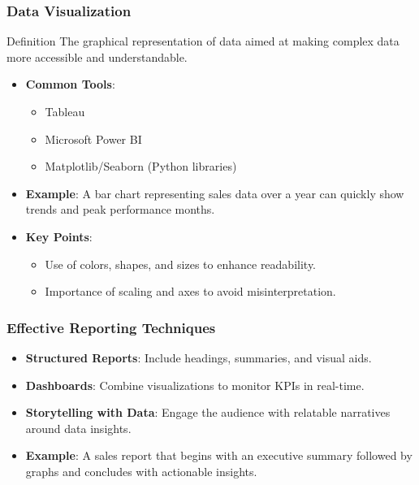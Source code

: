 \documentclass[aspectratio=169]{beamer}
\begin{document}
\begin{frame}[fragile]
    \frametitle{Data Visualization}
    \begin{block}{Definition}
        The graphical representation of data aimed at making complex data more accessible and understandable.
    \end{block}
    \begin{itemize}
        \item \textbf{Common Tools}:
        \begin{itemize}
            \item Tableau
            \item Microsoft Power BI
            \item Matplotlib/Seaborn (Python libraries)
        \end{itemize}
        \item \textbf{Example}: A bar chart representing sales data over a year can quickly show trends and peak performance months.
        \item \textbf{Key Points}:
        \begin{itemize}
            \item Use of colors, shapes, and sizes to enhance readability.
            \item Importance of scaling and axes to avoid misinterpretation.
        \end{itemize}
    \end{itemize}
\end{frame}

\begin{frame}[fragile]
    \frametitle{Effective Reporting Techniques}
    \begin{itemize}
        \item \textbf{Structured Reports}: Include headings, summaries, and visual aids.
        \item \textbf{Dashboards}: Combine visualizations to monitor KPIs in real-time.
        \item \textbf{Storytelling with Data}: Engage the audience with relatable narratives around data insights.
        \item \textbf{Example}: A sales report that begins with an executive summary followed by graphs and concludes with actionable insights.
    \end{itemize}
\end{frame}
\end{document}
